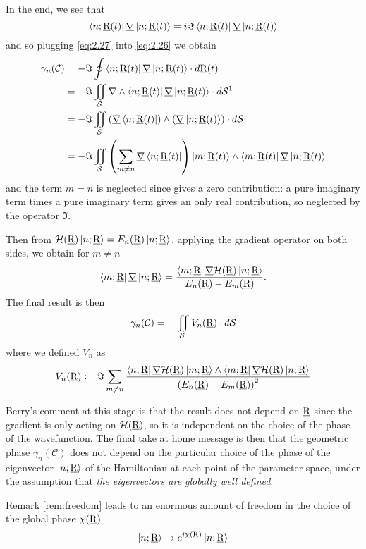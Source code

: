 In the end, we see that 
\begin{equation}
\Bra{n;\underline{\textrm{R}}(t)}\underline{\nabla}\Ket{n;\underline{\textrm{R}}(t)}=i\Im\Bra{n;\underline{\textrm{R}}(t)}\underline{\nabla}\Ket{n;\underline{\textrm{R}}(t)}
\label{eq:2.27}
\end{equation}
and so plugging \eqref{eq:2.27} into \eqref{eq:2.26} we obtain
\begin{align}
\gamma_n(\mathcal{C})&=-\Im \oint \Bra{n;\rp(t)}\underline{\nabla}\Ket{n;\rp(t)}\cdot\diff\rp(t)\\
&=-\Im\iint_{\mathcal{S}}\nabla\wedge\Bra{n;\rp(t)}\underline{\nabla}\Ket{n;\rp(t)}\cdot\diff\mathcal{S}\text{\footnotemark}\\
&=-\Im\iint_{\mathcal{S}}\left(\underline{\nabla}\Bra{n;\rp(t)}\right)\wedge\left(\underline{\nabla}\Ket{n;\rp(t)}\right)\cdot\diff\mathcal{S}\\
&= -\Im \iint_{\mathcal{S}}\left(\sum_{m\neq n}\underline{\nabla}\Bra{n;\rp(t)}\right)\Ket{m;\rp(t)}\wedge\Bra{m;\rp(t)}\underline{\nabla}\Ket{n;\rp(t)}
\end{align}
and the term $ m=n $ is neglected since gives a zero contribution: a pure imaginary term times a pure imaginary term gives an only real contribution, so neglected by the operator $ \Im. $

Then from $ \mathcal{H}(\underline{\textrm{R}})\Ket{n;\underline{\textrm{R}}}=E_n(\underline{\textrm{R}})\Ket{n;\underline{\textrm{R}}} $, applying the gradient operator on both sides, we obtain for $ m\neq n $
\begin{equation}
\Bra{m;\underline{\textrm{R}}}\underline{\nabla}\Ket{n;\underline{\textrm{R}}}=\dfrac{\Bra{m;\underline{\textrm{R}}}\underline{\nabla}\mathcal{H}(\underline{\textrm{R}})\Ket{n;\underline{\textrm{R}}}}{E_n(\underline{\textrm{R}})-E_m(\underline{\textrm{R}})}.
\end{equation}
The final result is then
\begin{equation}
\gamma_n(\mathcal{C})=-\iint_{\mathcal{S}}V_n(\underline{\textrm{R}})\cdot\mathop{}\!d\mathcal{S}
\end{equation}
where we defined $ V_n $ as 
\begin{equation}
V_n(\underline{\textrm{R}}):=\Im\sum_{m\neq n}\dfrac{\Bra{n;\underline{\textrm{R}}}\underline{\nabla}\mathcal{H}(\underline{\textrm{R}})\Ket{m;\underline{\textrm{R}}}\wedge\Bra{m;\underline{\textrm{R}}}\underline{\nabla}\mathcal{H}(\underline{\textrm{R}})\Ket{n;\underline{\textrm{R}}}}{\left(E_n(\underline{\textrm{R}})-E_m(\underline{\textrm{R}})\right)^2}
\label{eq:2.31}
\end{equation}
\begin{rem}
	Berry's comment at this stage is that the result does not depend on $ \underline{\textrm{R}} $ since the gradient is only acting on $ \mathcal{H}(\underline{\textrm{R}}) $, so it is independent on the choice of the phase of the wavefunction. The final take at home message is then that the geometric phase $ \gamma_n(\mathcal{C}) $ does not depend on the particular choice of the phase of the eigenvector $ \Ket{n;\underline{\textrm{R}}} $ of the Hamiltonian at each point of the parameter space, under the assumption that \emph{the eigenvectors are globally well defined}.
	\label{rem:freedom}
\end{rem}
Remark \ref{rem:freedom} leads to an enormous amount of freedom in the choice of the global phase $ \chi(\underline{\textrm{R}}) $
\begin{equation}
\Ket{n;\underline{\textrm{R}}}\to e^{i\chi(\underline{\textrm{R}})}\Ket{n;\underline{\textrm{R}}}
\end{equation}
